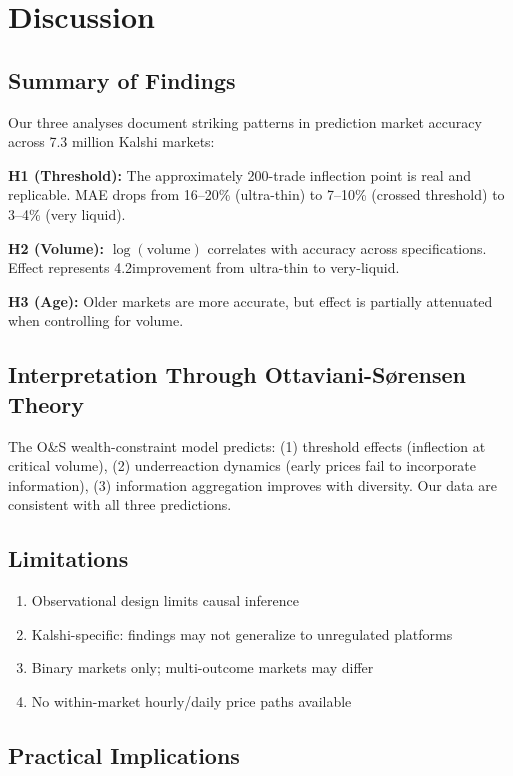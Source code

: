 \documentclass[a4paper,11pt]{article}
\theoremstyle{plain}
\theoremstyle{definition}
\begin{document}
\section{Discussion}
\label{sec:discussion}

\subsection{Summary of Findings}

Our three analyses document striking patterns in prediction market accuracy across 7.3 million Kalshi markets:

\textbf{H1 (Threshold):} The approximately 200-trade inflection point is real and replicable. MAE drops from 16--20\% (ultra-thin) to 7--10\% (crossed threshold) to 3--4\% (very liquid).

\textbf{H2 (Volume):} $\log(\text{volume})$ correlates with accuracy across specifications. Effect represents 4.2\times improvement from ultra-thin to very-liquid.

\textbf{H3 (Age):} Older markets are more accurate, but effect is partially attenuated when controlling for volume.

\subsection{Interpretation Through Ottaviani-Sørensen Theory}

The O&S wealth-constraint model predicts: (1) threshold effects (inflection at critical volume), (2) underreaction dynamics (early prices fail to incorporate information), (3) information aggregation improves with diversity. Our data are consistent with all three predictions.

\subsection{Limitations}

\begin{enumerate}
\item Observational design limits causal inference
\item Kalshi-specific: findings may not generalize to unregulated platforms
\item Binary markets only; multi-outcome markets may differ
\item No within-market hourly/daily price paths available
\end{enumerate}

\subsection{Practical Implications}
\end{document}
